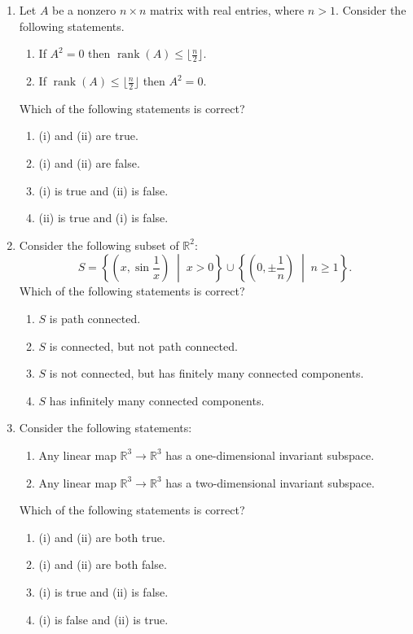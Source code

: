 \documentclass[11pt, a4paper]{article}
\begin{document}
\begin{enumerate}
  \item Let $A$ be a nonzero $n \times n$ matrix with real entries, where $n > 1$. Consider the following statements.
  \begin{enumerate}[label=(\roman*)]
    \item If $A^2 = 0$ then $\operatorname{rank}(A) \le \lfloor \frac{n}{2} \rfloor$.
    \item If $\operatorname{rank}(A) \le \lfloor \frac{n}{2} \rfloor$ then $A^2 = 0$.
  \end{enumerate}
  Which of the following statements is correct?
  \begin{enumerate}[label=(\alph*)]
    \item (i) and (ii) are true.
    \item (i) and (ii) are false.
    \item (i) is true and (ii) is false.
    \item (ii) is true and (i) is false.
  \end{enumerate}

  \item Consider the following subset of $\mathbb{R}^2$:
  \[
    S = \left\{\left(x, \sin\frac{1}{x}\right) \;\middle|\; x > 0\right\} \cup \left\{\left(0, \pm\frac{1}{n}\right) \;\middle|\; n \ge 1\right\}.
  \]
  Which of the following statements is correct?
  \begin{enumerate}[label=(\alph*)]
    \item $S$ is path connected.
    \item $S$ is connected, but not path connected.
    \item $S$ is not connected, but has finitely many connected components.
    \item $S$ has infinitely many connected components.
  \end{enumerate}

  \item Consider the following statements:
  \begin{enumerate}[label=(\roman*)]
    \item Any linear map $\mathbb{R}^3 \to \mathbb{R}^3$ has a one-dimensional invariant subspace.
    \item Any linear map $\mathbb{R}^3 \to \mathbb{R}^3$ has a two-dimensional invariant subspace.
  \end{enumerate}
  Which of the following statements is correct?
  \begin{enumerate}[label=(\alph*)]
    \item (i) and (ii) are both true.
    \item (i) and (ii) are both false.
    \item (i) is true and (ii) is false.
    \item (i) is false and (ii) is true.
  \end{enumerate}


\end{enumerate}
\end{document}
